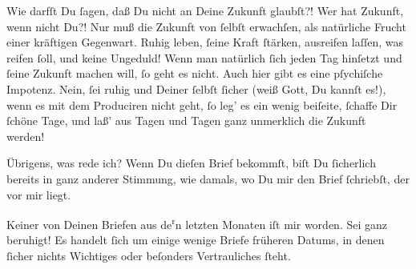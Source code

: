 \pstart
           Wie darfſt Du{ }ſagen, daß Du nicht an Deine Zukunft glaubſt?! Wer hat Zukunft, wenn
               nicht Du?! Nur muß die Zukunft von{ }ſelbſt erwachſen, als natürliche Frucht einer
               kräftigen Gegenwart. Ruhig leben,{ }ſeine Kraft{ }ſtärken, ausreifen laſſen, was reifen{ }ſoll, und keine Ungeduld! Wenn man natürlich{ }ſich jeden Tag hinſetzt und{ }ſeine
               Zukunft machen will,{ }ſo geht es nicht. Auch hier gibt es  eine pſychiſche Impotenz. Nein,{ }ſei ruhig und Deiner{ }ſelbſt{ }ſicher (weiß Gott,
               Du kannſt es!), {\pb}wenn es mit  dem Produciren nicht geht,{ }ſo leg’ es ein wenig
               beiſeite,{ }ſchaffe Dir{ }ſchöne Tage, und laß’ aus Tagen und Tagen ganz unmerklich die
               Zukunft werden! {\dotsfour}\pend
           
\pstart
           Übrigens, was rede ich? Wenn Du dieſen Brief bekommſt, biſt Du{ }ſicherlich bereits in
               ganz anderer Stimmung, wie damals, wo Du mir  den
               Brief{ }ſchriebſt, der vor mir liegt.\pend
           
\pstart
           Keiner von Deinen Briefen aus de\substVorne{}\textsuperscript{r}\substDazwischen{}n\substHinten{} letzten Monaten iſt mir \label{K_L02834-2v}\label{K_L02834-2} worden. Sei ganz beruhigt! Es handelt{ }ſich um einige wenige Briefe früheren
               Datums, in denen{ }ſicher nichts Wichtiges oder beſonders Vertrauliches{ }ſteht.\pend
           
